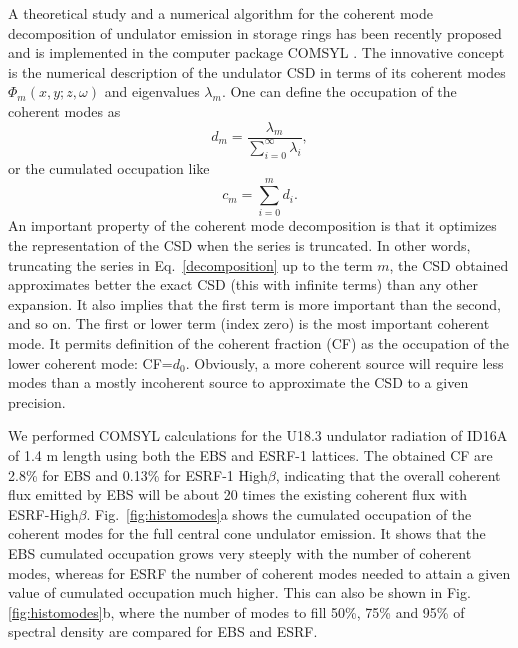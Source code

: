 \documentclass{iucr}              %
\begin{document}
A theoretical study and a numerical algorithm for the coherent mode decomposition of undulator emission in storage rings has been recently proposed  \cite{GlassThesis,GlassEPL} and is implemented in the computer package COMSYL \cite{codeCOMSYL}. The innovative concept is the numerical description of the undulator CSD in terms of its coherent modes $\Phi_m(x,y;z,\omega)$ and eigenvalues $\lambda_m $. One can define the occupation of the coherent modes as
\begin{equation}
 d_m = \frac{\lambda_m}{\sum\limits_{i=0}^{\infty} \lambda_i},
\end{equation}
or the cumulated occupation like
\begin{equation}
 c_m = \sum\limits_{i=0}^{m} d_i.
\end{equation}
An important property of the coherent mode decomposition is that it optimizes the representation of the CSD when the series is truncated. In other words, truncating the series in Eq.~\ref{decomposition} up to the term $m$, the CSD obtained approximates better the exact CSD (this with infinite terms) than any other expansion. It also implies that the first term is more important than the second, and so on. The first or lower term (index zero) is the most important coherent mode. It permits definition of the coherent fraction (CF) as the occupation of the lower coherent mode: CF=$d_0$. Obviously, a more coherent source will require less modes than a mostly incoherent source to approximate the CSD to a given precision.

We performed COMSYL calculations for the U18.3 undulator radiation of ID16A of 1.4 m length using both the EBS and ESRF-1 lattices. The obtained CF are 2.8\% for EBS and 0.13\% for ESRF-1 High$\beta$, indicating that the overall coherent flux emitted by EBS will be about 20 times the existing coherent flux with ESRF-High$\beta$. Fig.~\ref{fig:histomodes}a shows the cumulated occupation of the coherent modes for the full central cone undulator emission. It shows that the EBS cumulated occupation grows very steeply with the number of coherent modes, whereas for ESRF the number of coherent modes needed to attain a given value of cumulated occupation much higher. This can also be shown in Fig.\ref{fig:histomodes}b, where the number of modes to fill 50\%, 75\% and 95\% of spectral density are compared for EBS and ESRF.   
\end{document}
